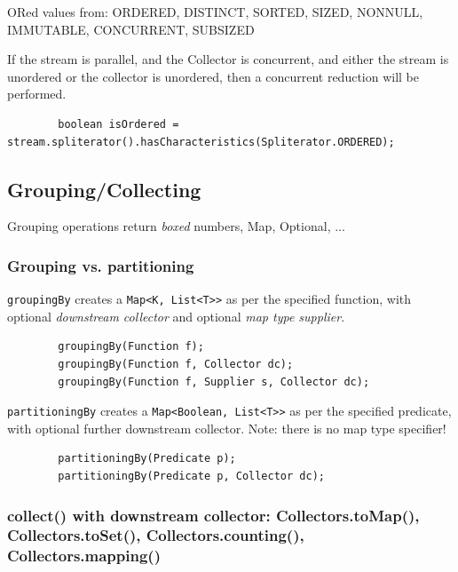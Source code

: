 \documentclass{scrartcl}
\begin{document}
    ORed values from: ORDERED, DISTINCT, SORTED, SIZED, NONNULL, IMMUTABLE, CONCURRENT, SUBSIZED

    If the stream is parallel, and the Collector is concurrent,
    and either the stream is unordered or the collector is unordered,
    then a concurrent reduction will be performed.

    \begin{lstlisting}
        boolean isOrdered = stream.spliterator().hasCharacteristics(Spliterator.ORDERED);
    \end{lstlisting}

\subsection{Grouping/Collecting}

    Grouping operations return \textit{boxed} numbers, Map, Optional, ...

\subsubsection{Grouping vs. partitioning}

    \lstinline{groupingBy} creates a \lstinline{Map<K, List<T>>} as per the specified function, with optional \textit{downstream collector} and optional \textit{map type supplier}.

    \begin{lstlisting}
        groupingBy(Function f);
        groupingBy(Function f, Collector dc);
        groupingBy(Function f, Supplier s, Collector dc);
    \end{lstlisting}

    \lstinline{partitioningBy} creates a \lstinline{Map<Boolean, List<T>>} as per the specified predicate, with optional further downstream collector.
    Note: there is no map type specifier!

    \begin{lstlisting}
        partitioningBy(Predicate p);
        partitioningBy(Predicate p, Collector dc);
    \end{lstlisting}

\subsubsection{collect() with downstream collector: Collectors.toMap(), Collectors.toSet(), Collectors.counting(), Collectors.mapping()}
\end{document}
